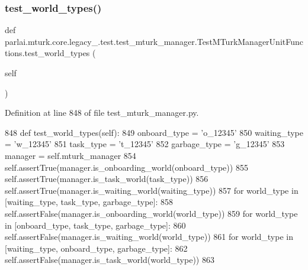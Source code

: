 \mbox{\label{classparlai_1_1mturk_1_1core_1_1legacy__2018_1_1test_1_1test__mturk__manager_1_1TestMTurkManagerUnitFunctions_a0197de521f0518395373a689f896b5a1}} 
\subsubsection{\texorpdfstring{test\+\_\+world\+\_\+types()}{test\_world\_types()}}
{\footnotesize\ttfamily def parlai.\+mturk.\+core.\+legacy\+\_.\+test.\+test\+\_\+mturk\+\_\+manager.\+Test\+M\+Turk\+Manager\+Unit\+Functions.\+test\+\_\+world\+\_\+types (\begin{DoxyParamCaption}\item[{}]{self }\end{DoxyParamCaption})}



Definition at line 848 of file test\+\_\+mturk\+\_\+manager.\+py.


\begin{DoxyCode}
848     \textcolor{keyword}{def }test\_world\_types(self):
849         onboard\_type = \textcolor{stringliteral}{'o\_12345'}
850         waiting\_type = \textcolor{stringliteral}{'w\_12345'}
851         task\_type = \textcolor{stringliteral}{'t\_12345'}
852         garbage\_type = \textcolor{stringliteral}{'g\_12345'}
853         manager = self.mturk\_manager
854         self.assertTrue(manager.is\_onboarding\_world(onboard\_type))
855         self.assertTrue(manager.is\_task\_world(task\_type))
856         self.assertTrue(manager.is\_waiting\_world(waiting\_type))
857         \textcolor{keywordflow}{for} world\_type \textcolor{keywordflow}{in} [waiting\_type, task\_type, garbage\_type]:
858             self.assertFalse(manager.is\_onboarding\_world(world\_type))
859         \textcolor{keywordflow}{for} world\_type \textcolor{keywordflow}{in} [onboard\_type, task\_type, garbage\_type]:
860             self.assertFalse(manager.is\_waiting\_world(world\_type))
861         \textcolor{keywordflow}{for} world\_type \textcolor{keywordflow}{in} [waiting\_type, onboard\_type, garbage\_type]:
862             self.assertFalse(manager.is\_task\_world(world\_type))
863 
\end{DoxyCode}



